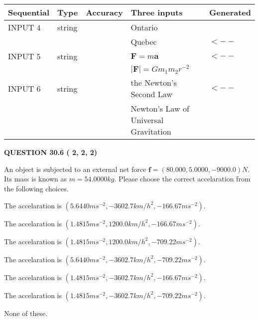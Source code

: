 \documentclass[12pt]{article}
\begin{document}
  
\noindent\begin{tabular}{|l|l|l|l|l|}
\hline
 Sequential & Type & Accuracy & Three inputs & Generated \\ 
\hline
 
 
  INPUT $           4$ & string & & 
 Ontario & 
  \\
  & & & 
 Quebec & 
  $ <-- $ 
 \\  \hline  
 
 
  INPUT $           5$ & string & & 
 $\mathbf{F}=m\mathbf{a}$ & 
  $ <-- $ 
  \\
  & & & 
 $\left| \mathbf{F}\right| =Gm_1m_2r^{-2}$ & 
 \\  \hline  
 
 
  INPUT $           6$ & string & & 
 the Newton's Second Law & 
  $ <-- $ 
  \\
  & & & 
 Newton's Law of Universal Gravitation & 
 \\  \hline  
 \end{tabular}
   
   
  
\vspace{0.2in}
  
{\textbf{\Large{QUESTION
30.6 
 (          2,          2,          2)
}}}
  
  
 
An object is subjected to an external net force $\mathbf{f}=(
80.000 ,
5.0000,
-9000.0  )N$. Its mass is known as
$m= %
54.0000  kg$. Please choose the correct accelaration
from the following choices.
 
 
 
The accelaration is
$(
5.6440ms^{-2},
-3602.7km/h^2,
-166.67ms^{-2}
).
$
 
 
The accelaration is
$(
1.4815ms^{-2},
1200.0km/h^2,
-166.67ms^{-2}
).
$
 
 
The accelaration is
$(
1.4815ms^{-2},
1200.0km/h^2,
-709.22ms^{-2}
).
$
 
 
The accelaration is
$(
5.6440ms^{-2},
-3602.7km/h^2,
-709.22ms^{-2}
).
$
 
 
The accelaration is
$(
1.4815ms^{-2},
-3602.7km/h^2,
-166.67ms^{-2}
).
$
 
 
The accelaration is
$(
1.4815ms^{-2},
-3602.7km/h^2,
-709.22ms^{-2}
).
$
 
 
 None of these.
 
\end{document}
